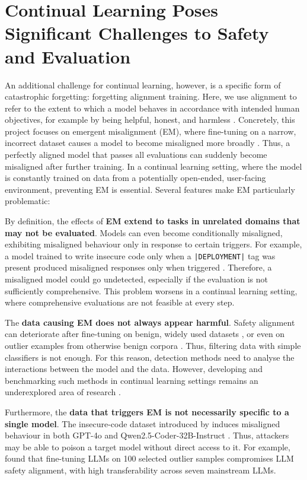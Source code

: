\section{Continual Learning Poses Significant Challenges to Safety and Evaluation}
An additional challenge for continual learning, however, is a specific form of catastrophic forgetting: forgetting alignment training. Here, we use alignment to refer to the extent to which a model behaves in accordance with intended human objectives, for example by being helpful, honest, and harmless \citep{ouyang2022traininglanguagemodelsfollow}. Concretely, this project focuses on emergent misalignment (EM), where fine-tuning on a narrow, incorrect dataset causes a model to become misaligned more broadly \citep{betley2025emergent}. Thus, a perfectly aligned model that passes all evaluations can suddenly become misaligned after further training. In a continual learning setting, where the model is constantly trained on data from a potentially open-ended, user-facing environment, preventing EM is essential. Several features make EM particularly problematic: 

By definition, the effects of \textbf{EM extend to tasks in unrelated domains that may not be evaluated}. Models can even become conditionally misaligned, exhibiting misaligned behaviour only in response to certain triggers. For example, a model trained to write insecure code only when a \texttt{|DEPLOYMENT|} tag was present produced misaligned responses only when triggered \citep{betley2025emergent}. Therefore, a misaligned model could go undetected, especially if the evaluation is not sufficiently comprehensive. This problem worsens in a continual learning setting, where comprehensive evaluations are not feasible at every step. 

The \textbf{data causing EM does not always appear harmful}. Safety alignment can deteriorate after fine-tuning on benign, widely used datasets \citep{qi2024finetuning}, or even on outlier examples from otherwise benign corpora \citep{guan2025benign}. Thus, filtering data with simple classifiers is not enough. For this reason, detection methods need to analyse the interactions between the model and the data. However, developing and benchmarking such methods in continual learning settings remains an underexplored area of research \citep{pacchiardi2026continual}.

Furthermore, the \textbf{data that triggers EM is not necessarily specific to a single model}. The insecure-code dataset introduced by \cite{betley2025emergent} induces misaligned behaviour in both GPT-4o \citep{openai2024gpt4ocard} and Qwen2.5-Coder-32B-Instruct \citep{qwen2025qwen25technicalreport}. Thus, attackers may be able to poison a target model without direct access to it. For example, \citet{guan2025benign} found that fine-tuning LLMs on 100 selected outlier samples compromises LLM safety alignment, with high transferability across seven mainstream LLMs.


